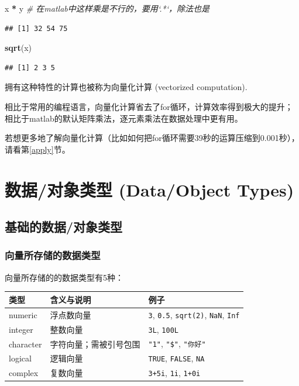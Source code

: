 \documentclass[]{book}
\newenvironment{Shaded}{\begin{snugshade}}{\end{snugshade}}
\newcommand{\CommentTok}[1]{\textcolor[rgb]{0.56,0.35,0.01}{\textit{#1}}}
\newcommand{\KeywordTok}[1]{\textcolor[rgb]{0.13,0.29,0.53}{\textbf{#1}}}
\newcommand{\NormalTok}[1]{#1}
\newcommand{\OperatorTok}[1]{\textcolor[rgb]{0.81,0.36,0.00}{\textbf{#1}}}
\newcommand{\StringTok}[1]{\textcolor[rgb]{0.31,0.60,0.02}{#1}}
\begin{document}
\begin{Shaded}
\begin{Highlighting}[]
\NormalTok{x }\OperatorTok{*}\StringTok{ }\NormalTok{y }\CommentTok{# 在matlab中这样乘是不行的，要用`.*`，除法也是}
\end{Highlighting}
\end{Shaded}

\begin{verbatim}
## [1] 32 54 75
\end{verbatim}

\begin{Shaded}
\begin{Highlighting}[]
\KeywordTok{sqrt}\NormalTok{(x)}
\end{Highlighting}
\end{Shaded}

\begin{verbatim}
## [1] 2 3 5
\end{verbatim}

拥有这种特性的计算也被称为向量化计算 (vectorized computation).

相比于常用的编程语言，向量化计算省去了for循环，计算效率得到极大的提升；相比于matlab的默认矩阵乘法，逐元素乘法在数据处理中更有用。

若想更多地了解向量化计算（比如如何把for循环需要39秒的运算压缩到0.001秒），请看第\ref{apply}节。

\hypertarget{data-types}{%
\section{数据/对象类型 (Data/Object Types)}\label{data-types}}

\hypertarget{data-types-basics}{%
\subsection{基础的数据/对象类型}\label{data-types-basics}}

\subsubsection{向量所存储的数据类型}

向量所存储的的数据类型有5种：

\begin{longtable}[]{@{}lll@{}}
\toprule
类型 & 含义与说明 & 例子\tabularnewline
\midrule
\endhead
numeric & 浮点数向量 & \texttt{3}, \texttt{0.5}, \texttt{sqrt(2)}, \texttt{NaN}, \texttt{Inf}\tabularnewline
integer & 整数向量 & \texttt{3L}, \texttt{100L}\tabularnewline
character & 字符向量；需被引号包围 & \texttt{"1"}, \texttt{"\$"}, \texttt{"你好"}\tabularnewline
logical & 逻辑向量 & \texttt{TRUE}, \texttt{FALSE}, \texttt{NA}\tabularnewline
complex & 复数向量 & \texttt{3+5i}, \texttt{1i}, \texttt{1+0i}\tabularnewline
\bottomrule
\end{longtable}
\end{document}
